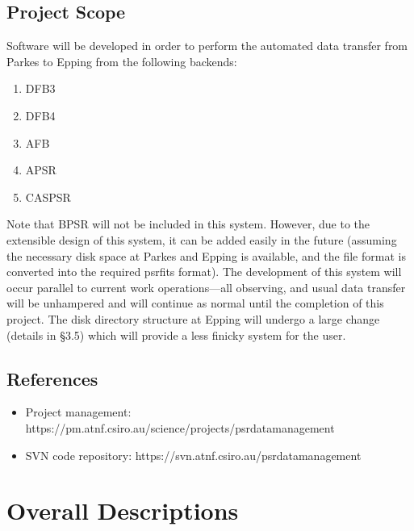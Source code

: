 \documentclass[a4paper,11pt]{article}
\begin{document}
\subsection{Project Scope}
Software will be developed in order to perform the automated data transfer from Parkes to Epping from the following backends:
\begin{enumerate}
\item DFB3
\item DFB4
\item AFB
\item APSR
\item CASPSR
\end{enumerate}

Note that BPSR will not be included in this system. However, due to the extensible design of this system, it can be added easily in the future (assuming the necessary disk space at Parkes and Epping is available, and the file format is converted into the required psrfits format). The development of this system will occur parallel to current work operations---all observing, and usual data transfer will be unhampered and will continue as normal until the completion of this project. The disk directory structure at Epping will undergo a large change (details in \S 3.5) which will provide a less finicky system for the user.

\subsection{References}
\begin{itemize}
\item Project management: https://pm.atnf.csiro.au/science/projects/psrdatamanagement
\item SVN code repository: https://svn.atnf.csiro.au/psrdatamanagement
\end{itemize}

\section{Overall Descriptions}
\end{document}
